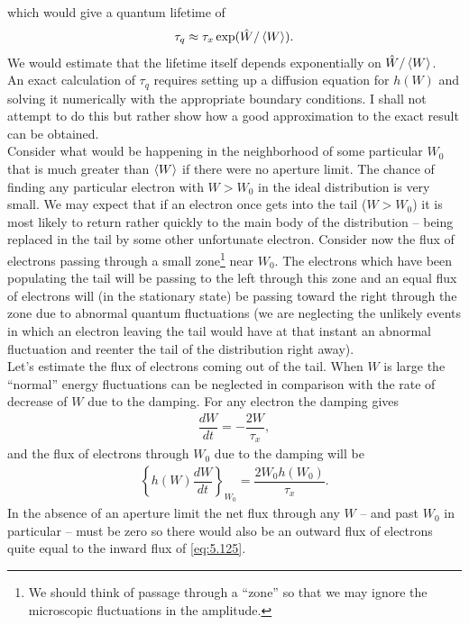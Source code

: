 \documentclass[../sands-adaptation.tex]{subfiles}
\begin{document}
which would give a quantum lifetime of
\begin{align}\label{eq:5.123}
	\tau_q \approx \tau_x \exp(\hat{W}/\left< W \right>).
\end{align}
We would estimate that the lifetime itself depends exponentially on $\hat{W}/\left< W \right>$.\\
An exact calculation of $\tau_q$ requires setting up a diffusion equation for $h(W)$ and solving it numerically with the appropriate boundary conditions. I shall not attempt to do this but rather show how a good approximation to the exact result can be obtained.\\
Consider what would be happening in the neighborhood of some particular $W_0$ that is much greater than $\left< W \right>$ if there were no aperture limit. The chance of finding any particular
 electron with $W > W_0$ in the ideal distribution is very small. We may expect that if an electron once gets into the tail ($W > W_0$) it is most likely to return rather quickly to the main body of the distribution -- being replaced in the tail by some other unfortunate electron. Consider now the flux of electrons passing through a small zone\footnote{We should think of passage through a ``zone'' so that we may ignore the microscopic fluctuations in the amplitude.} near $W_0$. The electrons which have been populating the tail will be passing to the left through this zone and an equal flux of electrons will (in the stationary state) be passing toward the right through the zone due to abnormal quantum fluctuations (we are neglecting the unlikely events in which an electron leaving the tail would have at that instant an abnormal fluctuation and reenter the tail of the distribution right away).\\
Let's estimate the flux of electrons coming out of the tail. When $W$ is large the ``normal'' energy fluctuations can be neglected in comparison with the rate of decrease of $W$ due to the damping. For any electron the damping gives
\begin{align}\label{eq:5.124}
	\dfrac{dW}{dt} = - \dfrac{2W}{\tau_x},
\end{align}
and the flux of electrons through $W_0$ due to the damping will be
\begin{align}\label{eq:5.125}
	\left\lbrace h(W) \dfrac{dW}{dt} \right\rbrace_{W_0} = \dfrac{2 W_0 h(W_0)}{\tau_x}.
\end{align}
In the absence of an aperture limit the net flux through any $W$ -- and past $W_0$ in particular
 -- must be zero so there would also be an outward flux of electrons quite equal to the inward flux of \eqref{eq:5.125}.\\
\end{document}
